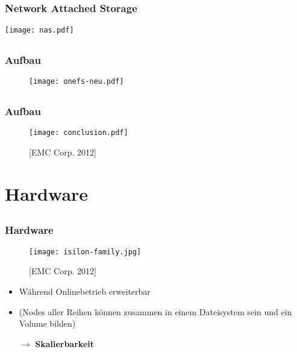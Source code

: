 \documentclass{beamer}
\begin{document}
\subsection{}
\begin{frame}[fragile]
  \frametitle{Network Attached Storage}
  \begin{center}\texttt{[image: nas.pdf]}\end{center}
\end{frame}

\subsection{}
\begin{frame}[fragile]
  \frametitle{Aufbau}
  
  \begin{figure}[htp]
    \centering
    \texttt{[image: onefs-neu.pdf]}
  \end{figure}

\end{frame}


\subsection{}
\begin{frame}[fragile]
  \frametitle{Aufbau}
  
  \begin{figure}[htp]
    \centering
    \texttt{[image: conclusion.pdf]}
    \caption{[EMC Corp. 2012]}
  \end{figure}

\end{frame}

\section{Hardware}

\subsection{}

  \begin{frame}[fragile]
  \frametitle{Hardware}
  
  \begin{figure}[htp]
    \centering
    \texttt{[image: isilon-family.jpg]}
    \caption{[EMC Corp. 2012]}
  \end{figure}
  
  \vspace{-5mm}
  
  \begin{itemize}
    \item Während Onlinebetrieb erweiterbar
    \item (Nodes aller Reihen können zusammen in einem Dateisystem sein und ein Volume bilden) 
    \vspace{1mm}
    \item[$\rightarrow$] \textbf{Skalierbarkeit}
    \end{itemize}

\end{frame}
\end{document}
